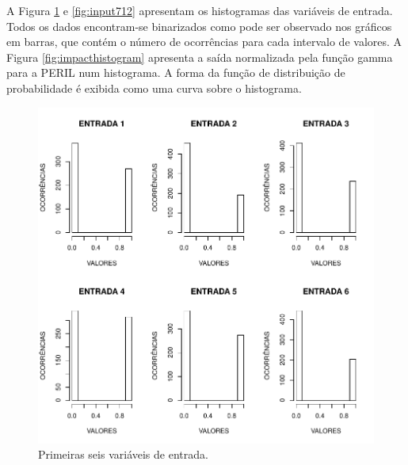 A Figura \ref{fig:input16} e \ref{fig:input712} apresentam os histogramas das variáveis de entrada. Todos os dados encontram-se binarizados como pode ser observado nos gráficos em barras, que contém o número de ocorrências para cada intervalo de valores. A Figura \ref{fig:impacthistogram} apresenta a saída normalizada pela função gamma para a PERIL num histograma. A forma da função de distribuição de probabilidade é exibida como uma curva sobre o histograma.

\begin{figure}[h]
  \vspace{-0.2cm}
  \centering
  \includegraphics[width=0.7\columnwidth]{image/input1_6.pdf}
  \caption{Primeiras seis variáveis de entrada.}
  \label{fig:input16}
\end{figure}

